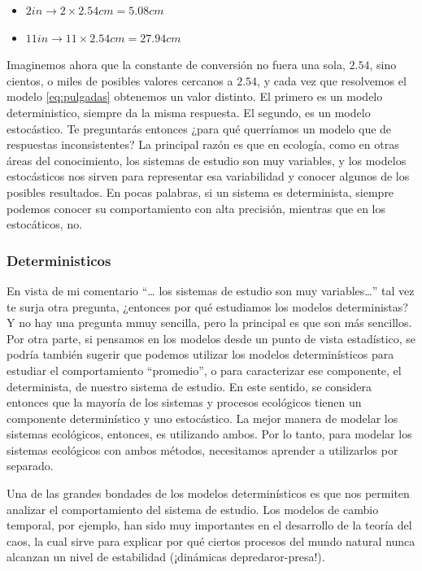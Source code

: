 \documentclass[
]{book}
\providecommand{\tightlist}{%
  \setlength{\itemsep}{0pt}\setlength{\parskip}{0pt}}
\begin{document}
\begin{itemize}
\tightlist
\item
  \(2in \rightarrow 2 \times 2.54cm = 5.08cm\)
\item
  \(11in \rightarrow 11 \times 2.54cm = 27.94cm\)
\end{itemize}

Imaginemos ahora que la constante de conversión no fuera una sola, \(2.54\), sino cientos, o miles de posibles valores cercanos a \(2.54\), y cada vez que resolvemos el modelo \eqref{eq:pulgadas} obtenemos un valor distinto. El primero es un modelo deterministico, siempre da la misma respuesta. El segundo, es un modelo estocástico. Te preguntarás entonces ¿para qué querríamos un modelo que de respuestas inconsistentes? La principal razón es que en ecología, como en otras áreas del conocimiento, los sistemas de estudio son muy variables, y los modelos estocásticos nos sirven para representar esa variabilidad y conocer algunos de los posibles resultados. En pocas palabras, si un sistema es determinista, siempre podemos conocer su comportamiento con alta precisión, mientras que en los estocáticos, no.

\hypertarget{deterministicos}{%
\subsubsection{Deterministicos}\label{deterministicos}}

En vista de mi comentario ``\ldots{} los sistemas de estudio son muy variables\ldots{}'' tal vez te surja otra pregunta, ¿entonces por qué estudiamos los modelos deterministas? Y no hay una pregunta mmuy sencilla, pero la principal es que son más sencillos. Por otra parte, si pensamos en los modelos desde un punto de vista estadístico, se podría también sugerir que podemos utilizar los modelos determinísticos para estudiar el comportamiento ``promedio'', o para caracterizar ese componente, el determinista, de nuestro sistema de estudio. En este sentido, se considera entonces que la mayoría de los sistemas y procesos ecológicos tienen un componente determinístico y uno estocástico. La mejor manera de modelar los sistemas ecológicos, entonces, es utilizando ambos. Por lo tanto, para modelar los sistemas ecológicos con ambos métodos, necesitamos aprender a utilizarlos por separado.

Una de las grandes bondades de los modelos determinísticos es que nos permiten analizar el comportamiento del sistema de estudio. Los modelos de cambio temporal, por ejemplo, han sido muy importantes en el desarrollo de la teoría del caos, la cual sirve para explicar por qué ciertos procesos del mundo natural nunca alcanzan un nivel de estabilidad (¡dinámicas depredaror-presa!).
\end{document}

